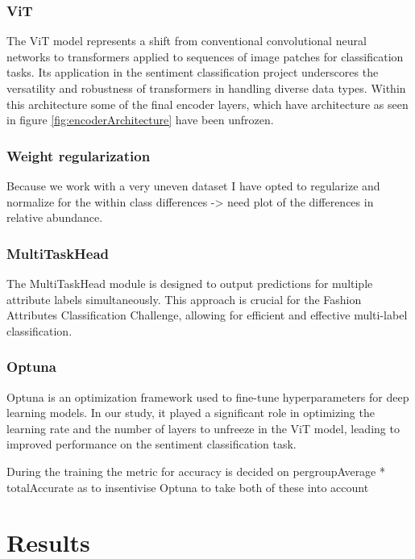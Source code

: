 \documentclass{article}
\begin{document}
\subsubsection{ViT}

The ViT model represents a shift from conventional convolutional neural networks to transformers applied to sequences of image patches for classification tasks. Its application in the sentiment classification project underscores the versatility and robustness of transformers in handling diverse data types. Within this architecture some of the final encoder layers, which have architecture as seen in figure \ref{fig:encoderArchitecture} have been unfrozen. 

\subsubsection{Weight regularization}
Because we work with a very uneven dataset I have opted to regularize and normalize for the within class differences 
-> need plot of the differences in relative abundance.

\subsubsection{MultiTaskHead}

The MultiTaskHead module is designed to output predictions for multiple attribute labels simultaneously. This approach is crucial for the Fashion Attributes Classification Challenge, allowing for efficient and effective multi-label classification. 

\subsubsection{Optuna}

Optuna is an optimization framework used to fine-tune hyperparameters for deep learning models. In our study, it played a significant role in optimizing the learning rate and the number of layers to unfreeze in the ViT model, leading to improved performance on the sentiment classification task.


During the training the metric for accuracy is decided on pergroupAverage * totalAccurate as to insentivise Optuna to take both of these into account 

\section{Results}
\end{document}
